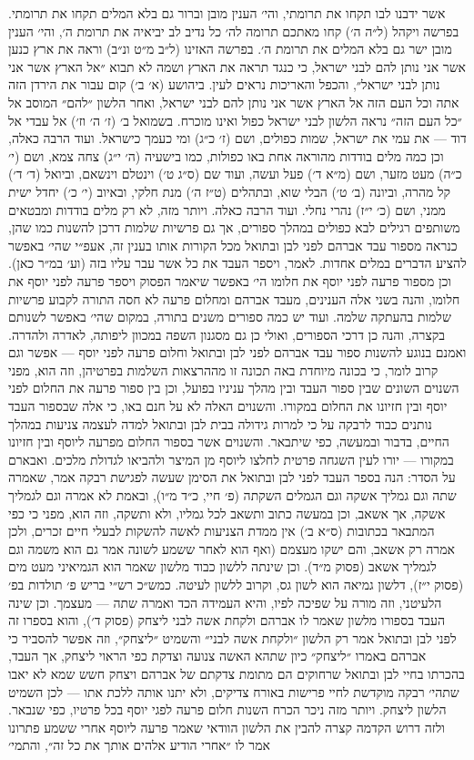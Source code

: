 \documentclass[12pt, openany]{book}
\begin{document}
אשר ידבנו לבו תקחו את תרומתי, והי׳ הענין מובן וברור גם בלא המלים תקחו את תרומתי. בפרשה ויקהל (ל״ה ה׳) קחו מאתכם תרומה לה׳ כל נדיב לב יביאיה את תרומת ה׳, והי׳ הענין מובן ישר גם בלא המלים את תרומת ה׳. בפרשה האזינו (ל״ב מ״ט ונ״ב) וראה את ארץ כנען אשר אני נותן להם לבני ישראל, כי כנגד תראה את הארץ ושמה לא תבוא ״אל הארץ אשר אני נותן לבני ישראל״, והכפל והאריכות נראים לעין. ביהושע (א׳ ב׳) קום עבור את הירדן הזה אתה וכל העם הזה אל הארץ אשר אני נותן להם לבני ישראל, ואחר הלשון ״להם״ המוסב אל ״כל העם הזה״ נראה הלשון לבני ישראל כפול ואינו מוכרח. בשמואל ב׳ (ז׳ ה׳ וז׳) אל עבדי אל דוד — את עמי את ישראל, שמות כפולים, ושם (ז׳ כ״ג) ומי כעמך כישראל. ועוד הרבה כאלה, וכן כמה מלים בודדות מהוראה אחת באו כפולות, כמו בישעיה (ה׳ י״ג) צחה צמא, ושם (י׳ כ״ה) מעט מזער, ושם (מ״א ד׳) פעל ועשה, ועוד שם (ס״ג ט׳) וינטלם וינשאם, וביואל (ד׳ ד׳) קל מהרה, וביונה (ב׳ ט׳) הבלי שוא, ובתהלים (ט״ז ה׳) מנת חלקי, ובאיוב (י׳ כ׳) יחדל ישית ממני, ושם (כ׳ י״ז) נהרי נחלי. ועוד הרבה כאלה. ויותר מזה, לא רק מלים בודדות ומבטאים משותפים רגילים לבא כפולים במהלך ספורים, אך גם פרשיות שלמות דרכן להשנות כמו שהן, כנראה מספור עבד אברהם לפני לבן ובתואל מכל הקורות אותו בענין זה, אעפ״י שהי׳ באפשר להציע הדברים במלים אחדות. לאמר, ויספר העבד את כל אשר עבר עליו בזה (וע׳ במ״ר כאן). וכן מספור פרעה לפני יוסף את חלומו הי׳ באפשר שיאמר הפסוק ויספר פרעה לפני יוסף את חלומו, והנה בשני אלה הענינים, מעבד אברהם ומחלום פרעה לא חסה התורה לקבוע פרשיות שלמות בהעתקה שלמה. ועוד יש כמה ספורים משנים בתורה, במקום שהי׳ באפשר לשנותם בקצרה, והנה כן דרכי הספורים, ואולי כן גם מסגנון השפה במכוון ליפותה, לאדרה ולהדרה. ואמנם בנוגע להשנות ספור עבד אברהם לפני לבן ובתואל וחלום פרעה לפני יוסף — אפשר וגם קרוב לומר, כי בכונה מיוחדת באה תכונה זו מההרצאות  השלמות בפרטיהן, וזה הוא, מפני השנוים השונים שבין ספור העבד ובין מהלך עניניו בפועל, וכן בין ספור פרעה את החלום לפני יוסף ובין חזיונו את החלום במקורו. והשנוים האלה לא על חנם באו, כי אלה שבספור העבד נותנים כבוד לרבקה על כי למרות גידולה בבית לבן ובתואל למדה לעצמה צניעות במהלך החיים, בדבור ובמעשה, כפי שיתבאר. והשנוים אשר בספור החלום מפרעה ליוסף ובין חזיונו במקורו — יורו לעין השגחה פרטית לחלצו ליוסף מן המיצר ולהביאו לגדולת מלכים. ואבארם על הסדר: הנה בספר העבד לפני לבן ובתואל את הסימן שעשה לפגישת רבקה אמר, שאמרה שתה וגם גמליך אשקה וגם הגמלים השקתה (פ׳ חיי, כ״ד מ״ו), ובאמת לא אמרה וגם לגמליך אשקה, אך אשאב, וכן במעשה כתוב ותשאב לכל גמליו, ולא ותשקה, וזה הוא, מפני כי כפי המתבאר בכתובות (ס״א ב׳) אין ממדת הצניעות לאשה להשקות לבעלי חיים זכרים, ולכן אמרה רק אשאב, והם ישקו מעצמם (ואף הוא לאחר ששמע לשונה אמר גם הוא משמה וגם לגמליך אשאב (פסוק מ״ד). וכן שינתה ללשון כבוד מלשון שאמר הוא הגמיאיני מעט מים (פסוק י״ז), דלשון גמיאה הוא לשון גס, וקרוב ללשון לעיטה. כמש״כ רש״י בריש פ׳ תולדות בפ׳ הלעיטני, וזה מורה על שפיכה לפיו, והיא העמידה הכד ואמרה שתה — מעצמך. וכן שינה העבד בספורו מלשון שאמר לו אברהם ולקחת אשה לבני ליצחק (פסוק ד׳), והוא בספרו זה לפני לבן ובתואל אמר רק הלשון ״ולקחת אשה לבני״ והשמיט ״ליצחק״, וזה אפשר להסביר כי אברהם באמרו ״ליצחק״ כיון שתהא האשה צנועה וצדקת כפי הראוי ליצחק, אך העבד, בהכרתו בחיי לבן ובתואל שרחוקים הם מתומת צדקתם של אברהם ויצחק חשש שמא לא יאבו שתהי׳ רבקה מוקדשת לחיי פרישות באורח צדיקים, ולא יתנו אותה ללכת אתו — לכן השמיט הלשון ליצחק. ויותר מזה ניכר הכרח השנות חלום פרעה לפגי יוסף בכל פרטיו, כפי שנבאר. ולזה דרוש הקדמה קצרה להבין את הלשון הוודאי שאמר פרעה ליוסף אחרי ששמע פתרונו אמר לו ״אחרי הודיע אלהים אותך את כל זה״, והתמי׳ 
\end{document}
